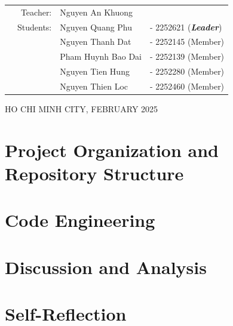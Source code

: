 \documentclass[openany]{mitthesis}
\theoremstyle{definition}
\begin{document}
\begin{titlepage}
\begin{table}[h]
\begin{tabular}{rrll}
\hspace{5 cm} & Teacher: & Nguyen An Khuong & \\
& Students: & Nguyen Quang Phu &- 2252621 (\textbf{\textit{Leader}})  \\
& & Nguyen Thanh Dat &- 2252145 (Member) \\
& & Pham Huynh Bao Dai &- 2252139 (Member) \\
& & Nguyen Tien Hung &- 2252280 (Member) \\
& & Nguyen Thien Loc &- 2252460 (Member) \\
\end{tabular}
\end{table}

\begin{center}
{\footnotesize HO CHI MINH CITY, FEBRUARY 2025}
\end{center}
\restoregeometry
\end{titlepage}

\tableofcontents
\listoffigures
\listoftables

\pgfplotsset{compat=1.18}

%



\chapter{Project Organization and Repository Structure}
    

\chapter{Code Engineering}
    
    
    
    

\chapter{Discussion and Analysis}
    


\chapter{Self-Reflection}
    
    

% 
\end{document}
